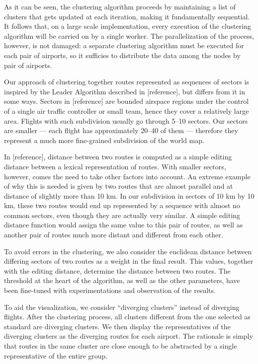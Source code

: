 \documentclass{vldb}
\begin{document}
As it can be seen, the clustering algorithm proceeds by maintaining a list of
clusters that gets updated at each iteration, making it fundamentally
sequential. It follows that, on a large scale implementation, every execution of
the clustering algorithm will be carried on by a single worker. The
parallelization of the process, however, is not damaged: a separate clustering
algorithm must be executed for each pair of airports, so it sufficies to
distribute the data among the nodes by pair of airports.

Our approach of clustering together routes represented as sequences of sectors
is inspired by the Leader Algorithm described in [reference], but differs from
it in some ways. Sectors in [reference] are bounded airspace regions under the
control of a single air traffic controller or small team, hence they cover a
relatively large area. Flights with such subdivision usually go through 5--10
sectors. Our sectors are smaller --- each flight has approximately 20--40 of
them --- therefore they represent a much more fine-grained subdivision of the
world map.

In [reference], distance between two routes is computed as a simple editing
distance between a lexical representation of routes. With smaller sectors,
however, comes the need to take other factors into account. An extreme example
of why this is needed is given by two routes that are almost parallel and at
distance of slightly more than 10 km. In our subdivision in sectors of 10 km by
10 km, these two routes would end up represented by a sequence with almost no
common sectors, even though they are actually very similar. A simple editing
distance function would assign the same value to this pair of routes, as well as
another pair of routes much more distant and different from each other.

To avoid errors in the clustering, we also consider the euclidean distance
between differing sectors of two routes as a weight in the final result. This
values, together with the editing distance, determine the distance between two
routes. The threshold at the heart of the algorithm, as well as the other
parameters, have been fine-tuned with experimentations and
observation of the results.

To aid the visualization, we consider ``diverging clusters'' instead of
diverging flights. After the clustering process, all clusters different from the
one selected as standard are diverging clusters. We then display the
representatives of the diverging clusters as the diverging routes for each
airport. The rationale is simply that routes in the same cluster are close
enough to be abstracted by a single representative of the entire group.
\end{document}
